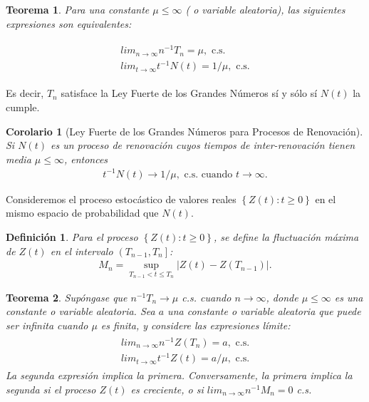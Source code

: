 \documentclass{article}
\newtheorem{Def}{Definición}[section]
\newtheorem{Teo}{Teorema}[section]
\newtheorem{Cor}{Corolario}[section]
\numberwithin{equation}{section}
\begin{document}
\begin{Teo}
Para una constante $\mu\leq\infty$ ( o variable aleatoria), las siguientes expresiones son equivalentes:

\begin{eqnarray}
\begin{array}{l}
lim_{n\rightarrow\infty}n^{-1}T_{n}=\mu,\textrm{ c.s.}\\
lim_{t\rightarrow\infty}t^{-1}N\left(t\right)=1/\mu,\textrm{ c.s.}
\end{array}
\end{eqnarray}
\end{Teo}

Es decir, $T_{n}$ satisface la Ley Fuerte de los Grandes N\'umeros s\'i y s\'olo s\'i $N\left(t\right)$ la cumple.

\begin{Cor}[Ley Fuerte de los Grandes N\'umeros para Procesos de Renovaci\'on]
Si $N\left(t\right)$ es un proceso de renovaci\'on cuyos tiempos de inter-renovaci\'on tienen media $\mu\leq\infty$, entonces
\begin{eqnarray}
t^{-1}N\left(t\right)\rightarrow 1/\mu,\textrm{ c.s. cuando }t\rightarrow\infty.
\end{eqnarray}
\end{Cor}

Consideremos el proceso estoc\'astico de valores reales $\left\{Z\left(t\right):t\geq0\right\}$ en el mismo espacio de probabilidad que $N\left(t\right)$.

\begin{Def}
Para el proceso $\left\{Z\left(t\right):t\geq0\right\}$, se define la fluctuaci\'on m\'axima de $Z\left(t\right)$ en el intervalo $\left(T_{n-1},T_{n}\right]$:
\begin{eqnarray*}
M_{n}=\sup_{T_{n-1}<t\leq T_{n}}|Z\left(t\right)-Z\left(T_{n-1}\right)|.
\end{eqnarray*}
\end{Def}

\begin{Teo}
Sup\'ongase que $n^{-1}T_{n}\rightarrow\mu$ c.s. cuando $n\rightarrow\infty$, donde $\mu\leq\infty$ es una constante o variable aleatoria. Sea $a$ una constante o variable aleatoria que puede ser infinita cuando $\mu$ es finita, y considere las expresiones l\'imite:
\begin{eqnarray}
\begin{array}{l}
lim_{n\rightarrow\infty}n^{-1}Z\left(T_{n}\right)=a,\textrm{ c.s.}\\
lim_{t\rightarrow\infty}t^{-1}Z\left(t\right)=a/\mu,\textrm{ c.s.}
\end{array}
\end{eqnarray}
La segunda expresi\'on implica la primera. Conversamente, la primera implica la segunda si el proceso $Z\left(t\right)$ es creciente, o si $lim_{n\rightarrow\infty}n^{-1}M_{n}=0$ c.s.
\end{Teo}
\end{document}

